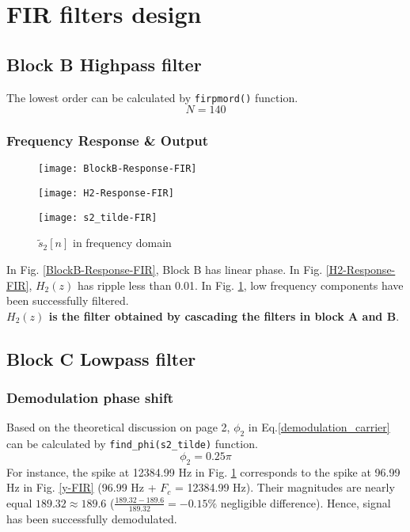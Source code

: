 \documentclass{article}
\newenvironment{homeworkProblem}[1]{
	\section{#1}
	}{
}
\newenvironment{homeworkSection}[1]{
	\subsection{#1}
	}{
}
\begin{document}
\begin{homeworkProblem}{FIR filters design}
\begin{homeworkSection}{Block B Highpass filter}
The lowest order can be calculated by \texttt{firpmord()} function.
\begin{equation}
N = 140
\end{equation}


\subsubsection{Frequency Response \& Output}
\begin{figure}[H]
\begin{minipage}[t]{0.33\linewidth}
\centering
\texttt{[image: BlockB-Response-FIR]}
\caption{Block B response}
\label{BlockB-Response-FIR}
\end{minipage}
\begin{minipage}[t]{0.33\linewidth}
\centering
\texttt{[image: H2-Response-FIR]}
\caption{$H_2(z)$ Response}
\label{H2-Response-FIR}
\end{minipage}
\begin{minipage}[t]{0.33\linewidth}
\centering
\texttt{[image: s2\_tilde-FIR]}
\caption{$\tilde{s}_2[n]$ in frequency domain}
\label{s2_tilde-FIR}
\end{minipage}
\end{figure}

In Fig. \ref{BlockB-Response-FIR}, Block B has linear phase. In Fig. \ref{H2-Response-FIR}, $H_2(z)$ has ripple less than 0.01. In Fig. \ref{s2_tilde-FIR}, low frequency components have been successfully filtered.\\

\textbf{$H_2(z)$ is the filter obtained by cascading the filters in block A and B}.

\end{homeworkSection}


\begin{homeworkSection}{Block C Lowpass filter}

\subsubsection{Demodulation phase shift}
Based on the theoretical discussion on page 2, $\phi_2$ in Eq.\ref{demodulation_carrier} can be calculated by \texttt{find\_phi(s2\_tilde)} function.
\begin{equation}
\phi_2 = 0.25 \pi
\end{equation}
For instance, the spike at 12384.99 Hz in Fig. \ref{s2_tilde-FIR} corresponds to the spike at 96.99 Hz in Fig. \ref{y-FIR} (96.99 Hz + $F_c$ = 12384.99 Hz). Their magnitudes are nearly equal $189.32 \approx 189.6$ ($\frac{189.32 - 189.6}{189.32} = -0.15\%$ negligible difference). Hence, signal has been successfully demodulated.


\end{homeworkSection}
\end{homeworkProblem}
\end{document}
